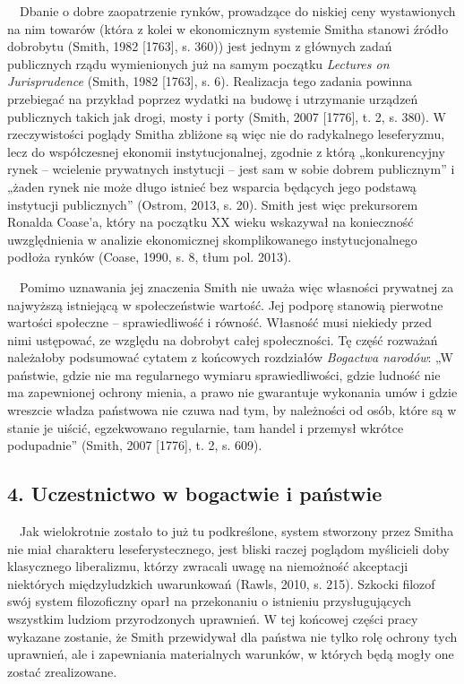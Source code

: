 \documentclass[a4paper]{article}
\begin{document}
\ \ Dbanie o dobre zaopatrzenie rynków, prowadzące do niskiej ceny wystawionych na nim towarów (która z kolei w
ekonomicznym systemie Smitha stanowi źródło dobrobytu \label{ref:RND3lhiPntOYy}(Smith, 1982 [1763], s. 360)) jest
jednym z głównych zadań publicznych rządu wymienionych już na samym początku \textit{Lectures on Jurisprudence
}\label{ref:RNDcEz98pxQ1r}(Smith, 1982 [1763], s. 6). Realizacja tego zadania powinna przebiegać na przykład poprzez
wydatki na budowę i utrzymanie urządzeń publicznych takich jak drogi, mosty i porty \label{ref:RNDun5237a8bv}(Smith,
2007 [1776], t. 2, s. 380). W rzeczywistości poglądy Smitha zbliżone są więc nie do radykalnego leseferyzmu, lecz do
współczesnej ekonomii instytucjonalnej, zgodnie z którą „konkurencyjny rynek – wcielenie prywatnych instytucji – jest
sam w sobie dobrem publicznym” i „żaden rynek nie może długo istnieć bez wsparcia będących jego podstawą instytucji
publicznych” \label{ref:RNDjhM4fjDb9v}(Ostrom, 2013, s. 20). Smith jest więc prekursorem Ronalda Coase’a, który na
początku XX wieku wskazywał na konieczność uwzględnienia w analizie ekonomicznej skomplikowanego instytucjonalnego
podłoża rynków \label{ref:RNDGvBhji2UBe}(Coase, 1990, s. 8, tłum pol. 2013). 

 \ \ Pomimo uznawania jej znaczenia Smith nie uważa więc własności prywatnej za najwyższą istniejącą w społeczeństwie
wartość. Jej podporę stanowią pierwotne wartości społeczne – sprawiedliwość i równość. Własność musi niekiedy przed
nimi ustępować, ze względu na dobrobyt całej społeczności. Tę część rozważań należałoby podsumować cytatem z końcowych
rozdziałów \textit{Bogactwa narodów}: „W państwie, gdzie nie ma regularnego wymiaru sprawiedliwości, gdzie ludność nie
ma zapewnionej ochrony mienia, a prawo nie gwarantuje wykonania umów i gdzie wreszcie władza państwowa nie czuwa nad
tym, by należności od osób, które są w stanie je uiścić, egzekwowano regularnie, tam handel i przemysł wkrótce
podupadnie” \label{ref:RNDNF5lVCSa0q}(Smith, 2007 [1776], t. 2, s. 609).

\subsection[4. Uczestnictwo w bogactwie i państwie]{4. Uczestnictwo w bogactwie i państwie}
\ \ Jak wielokrotnie zostało to już tu podkreślone, system stworzony przez Smitha nie miał charakteru leseferystecznego,
jest bliski raczej poglądom myślicieli doby klasycznego liberalizmu, którzy zwracali uwagę na niemożność akceptacji
niektórych międzyludzkich uwarunkowań \label{ref:RNDu40KwlEMET}(Rawls, 2010, s. 215). Szkocki filozof swój system
filozoficzny oparł na przekonaniu o istnieniu przysługujących wszystkim ludziom przyrodzonych uprawnień. W tej końcowej
części pracy wykazane zostanie, że Smith przewidywał dla państwa nie tylko rolę ochrony tych uprawnień, ale i
zapewniania materialnych warunków, w których będą mogły one zostać zrealizowane.
\end{document}
